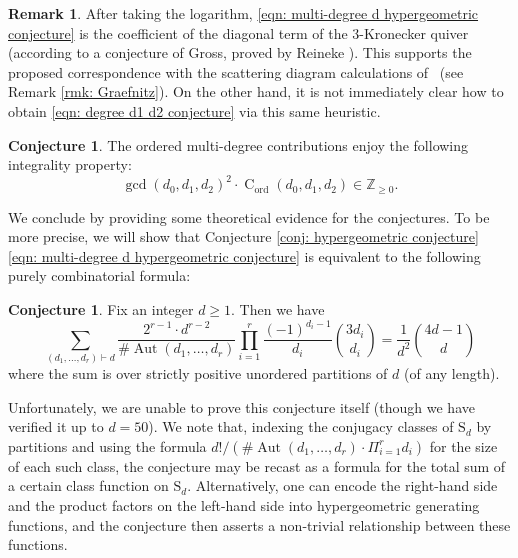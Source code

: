 \documentclass[11pt]{amsart}
\theoremstyle{definition}
\theoremstyle{definition}
\newtheorem{conjecture}[theorem]{Conjecture}
\newtheorem{remark}[theorem]{Remark}
\newcommand{\Z}{\mathbb{Z}}
\begin{document}
\begin{remark} After taking the logarithm, \eqref{eqn: multi-degree d hypergeometric conjecture} is the coefficient of the diagonal term of the $3$-Kronecker quiver (according to a conjecture of Gross, proved by Reineke \cite[Theorem 6.4]{Reineke}). This supports the proposed correspondence with the scattering diagram calculations of~\cite{Graefnitz} (see Remark \ref{rmk: Graefnitz}). On the other hand, it is not immediately clear how to obtain \eqref{eqn: degree d1 d2 conjecture} via this same heuristic.\end{remark}

\begin{conjecture} The ordered multi-degree contributions enjoy the following integrality property:
\begin{equation*} \operatorname{gcd}(d_0,d_1,d_2)^2 \cdot \operatorname{C}_{\operatorname{ord}}(d_0,d_1,d_2) \in \Z_{\geq 0}.\end{equation*}\end{conjecture}

We conclude by providing some theoretical evidence for the conjectures. To be more precise, we will show that Conjecture \ref{conj: hypergeometric conjecture} \eqref{eqn: multi-degree d hypergeometric conjecture} is equivalent to the following purely combinatorial formula:
\begin{conjecture} \label{conj: combinatorial conjecture} Fix an integer $d \geq 1$. Then we have
\begin{equation}\label{eqn: combinatorial conjecture}
	\sum_{(d_1,\ldots,d_r) \vdash d} \dfrac{2^{r-1} \cdot d^{r-2}}{\#\! \operatorname{Aut}(d_1,\ldots,d_r)} \prod_{i=1}^r \dfrac{(-1)^{d_i-1}}{d_i} {3d_i \choose d_i} = \dfrac{1}{d^2} {4d-1 \choose d} \end{equation}
where the sum is over strictly positive unordered partitions of $d$ (of any length).\end{conjecture}
Unfortunately, we are unable to prove this conjecture itself (though we have verified it up to $d=50$). We note that, indexing the conjugacy classes of $\mathrm{S}_d$ by partitions and using the formula $d!/(\#\!\operatorname{Aut}(d_1,\ldots,d_r) \cdot \Pi_{i=1}^r d_i )$ for the size of each such class, the conjecture may be recast as a formula for the total sum of a certain class function on $\mathrm{S}_d$. Alternatively, one can encode the right-hand side and the product factors on the left-hand side into hypergeometric generating functions, and the conjecture then asserts a non-trivial relationship between these functions.
\end{document}
